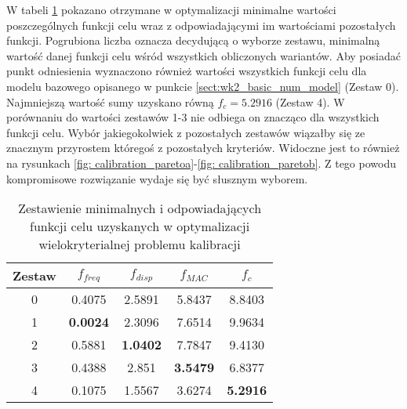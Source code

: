 W tabeli \ref{tab:minimal_values_calibration} pokazano otrzymane w optymalizacji minimalne wartości poszczególnych funkcji celu wraz z odpowiadającymi im wartościami pozostałych funkcji. Pogrubiona liczba oznacza decydującą o wyborze zestawu, minimalną wartość danej funkcji celu wśród wszystkich obliczonych wariantów. Aby posiadać punkt odniesienia wyznaczono również wartości wszystkich funkcji celu dla modelu bazowego opisanego w punkcie \ref{sect:wk2_basic_num_model} (Zestaw 0). Najmniejszą wartość sumy uzyskano równą $f_c=5.2916$ (Zestaw 4). W porównaniu do wartości zestawów 1-3 nie odbiega on znacząco dla wszystkich funkcji celu. Wybór jakiegokolwiek z pozostałych zestawów wiązałby się ze znacznym przyrostem któregoś z pozostałych kryteriów. Widoczne jest to również na rysunkach \ref{fig: calibration_paretoa}-\ref{fig: calibration_paretob}. Z tego powodu kompromisowe rozwiązanie wydaje się być słusznym wyborem. 

\begin{table}[]
	\caption{Zestawienie minimalnych i odpowiadających funkcji celu uzyskanych w optymalizacji wielokryterialnej problemu kalibracji}
	\centering
	\begin{tabular}{@{}ccccc@{}}
		
		\toprule
		Zestaw & \textbf{$f_{freq}$} & \textbf{$f_{disp}$} & \textbf{$f_{MAC}$} & \textbf{$f_{c}$} \\ \midrule
		0				& 0.4075			  & 2.5891				& 5.8437			 & 8.8403			\\ \midrule
		1               & \textbf{0.0024}     & 2.3096              & 7.6514             & 9.9634           \\ \midrule
		2               & 0.5881              & \textbf{1.0402}     & 7.7847             & 9.4130            \\ \midrule
		3               & 0.4388              & 2.851               & \textbf{3.5479}    & 6.8377           \\ \midrule
		4               & 0.1075              & 1.5567              & 3.6274             & \textbf{5.2916}  \\ \bottomrule
	\end{tabular}
	\label{tab:minimal_values_calibration}
\end{table}

